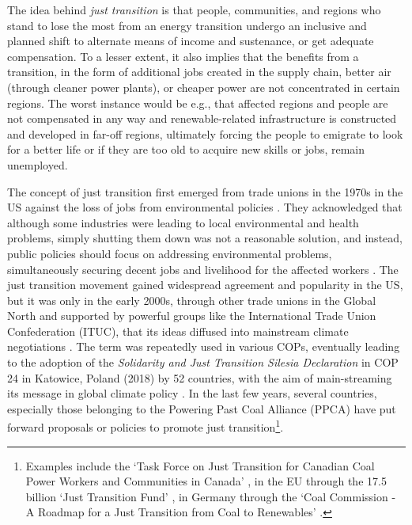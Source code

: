 \documentclass[../thesis.tex]{subfiles}
\begin{document}
The idea behind \textit{just transition} is that people, communities, and regions who stand to lose the most from an energy transition undergo an inclusive and planned shift to alternate means of income and sustenance, or get adequate compensation. To a lesser extent, it also implies that the benefits from a transition, in the form of additional jobs created in the supply chain, better air (through cleaner power plants), or cheaper power are not concentrated in certain regions. The worst instance would be e.g., that affected regions and people are not compensated in any way and renewable-related infrastructure is constructed and developed in far-off regions, ultimately forcing the people to emigrate to look for a better life or if they are too old to acquire new skills or jobs, remain unemployed.

The concept of just transition first emerged from trade unions in the 1970s in the US against the loss of jobs from environmental policies \citep{morena2018}. They acknowledged that although some industries were leading to local environmental and health problems, simply shutting them down was not a reasonable solution, and instead, public policies should focus on addressing environmental problems, simultaneously securing decent jobs and livelihood for the affected workers \citep{morena2018}. The just transition movement gained widespread agreement and popularity in the US, but it was only in the early 2000s, through other trade unions in the Global North and supported by powerful groups like the International Trade Union Confederation (ITUC), that its ideas diffused into mainstream climate negotiations \citep{morena2018}. The term was repeatedly used in various COPs, eventually leading to the adoption of the \textit{Solidarity and Just Transition Silesia Declaration} in COP 24 in Katowice, Poland (2018) by 52 countries, with the aim of main-streaming its message in global climate policy \citep{cop24}. In the last few years, several countries, especially those belonging to the Powering Past Coal Alliance (PPCA) have put forward proposals or policies to promote just transition\footnote{Examples include the `Task Force on Just Transition for Canadian Coal Power Workers and Communities in Canada' \citep{canada2018}, in the EU through the 17.5 billion \texteuro  `Just Transition Fund' \citep{eu_just}, in Germany through the `Coal Commission - A Roadmap for a Just Transition from Coal to Renewables' \citep{litz2019}.}. 
\end{document}
